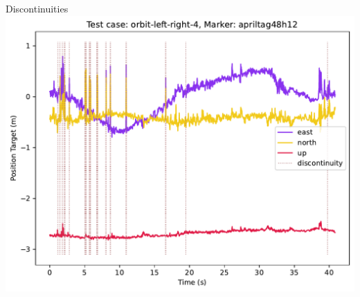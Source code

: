 \documentclass[aspectratio=169]{beamer}
\begin{document}

\begin{frame}{Discontinuities}
	\centering
	\includegraphics[width=0.75\linewidth]{images/orbit-left-right-4_apriltag48h12_position-target}
\end{frame}
\end{document}
